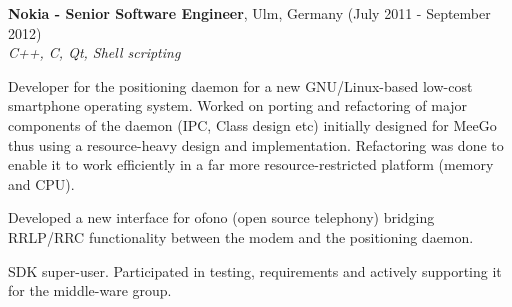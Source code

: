 \documentclass[alan.tex]{subfiles}
\begin{document}
\item \textbf{Nokia - Senior Software Engineer}, Ulm, Germany (July 2011 - September 2012)\\
  \emph{C++, C, Qt, Shell scripting}
  \begin{my_desc}
    \item[Developer] for the positioning daemon for a new GNU/Linux-based low-cost smartphone operating system.
        Worked on porting and refactoring of major components of the daemon (IPC, Class design etc) initially designed
        for MeeGo thus using a resource-heavy design and implementation. Refactoring was done to enable it to work
        efficiently in a far more resource-restricted platform (memory and CPU).
    \item[Developed] a new interface for ofono (open source telephony) bridging RRLP/RRC functionality between the
      modem and the positioning daemon.
    \item[SDK] super-user. Participated in testing, requirements and actively supporting it for the middle-ware group.
  \end{my_desc}
\end{document}
